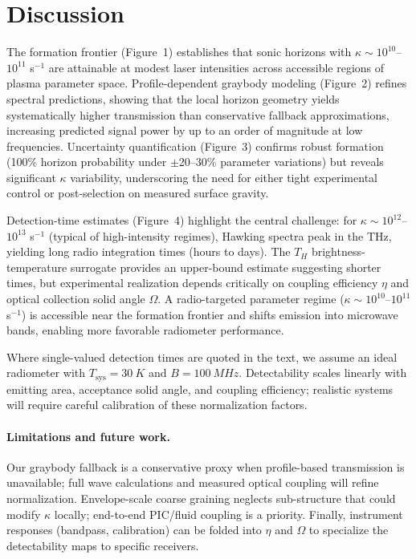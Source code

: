 \documentclass[11pt]{article}
\begin{document}
\section{Discussion}
The formation frontier (Figure~1) establishes that sonic horizons with $\kappa \sim 10^{10}$--$10^{11}$ s$^{-1}$ are attainable at modest laser intensities across accessible regions of plasma parameter space. Profile-dependent graybody modeling (Figure~2) refines spectral predictions, showing that the local horizon geometry yields systematically higher transmission than conservative fallback approximations, increasing predicted signal power by up to an order of magnitude at low frequencies. Uncertainty quantification (Figure~3) confirms robust formation (100\% horizon probability under $\pm$20--30\% parameter variations) but reveals significant $\kappa$ variability, underscoring the need for either tight experimental control or post-selection on measured surface gravity.

Detection-time estimates (Figure~4) highlight the central challenge: for $\kappa \sim 10^{12}$--$10^{13}$ s$^{-1}$ (typical of high-intensity regimes), Hawking spectra peak in the THz, yielding long radio integration times (hours to days). The $T_H$ brightness-temperature surrogate provides an upper-bound estimate suggesting shorter times, but experimental realization depends critically on coupling efficiency $\eta$ and optical collection solid angle $\Omega$. A radio-targeted parameter regime ($\kappa \sim 10^{10}$--$10^{11}$ s$^{-1}$) is accessible near the formation frontier and shifts emission into microwave bands, enabling more favorable radiometer performance.

Where single-valued detection times are quoted in the text, we assume an ideal radiometer with $T_{\mathrm{sys}}=\SI{30}{K}$ and $B=\SI{100}{MHz}$. Detectability scales linearly with emitting area, acceptance solid angle, and coupling efficiency; realistic systems will require careful calibration of these normalization factors.

\paragraph{Limitations and future work.}
Our graybody fallback is a conservative proxy when profile-based transmission is unavailable; full wave calculations and measured optical coupling will refine normalization. Envelope-scale coarse graining neglects sub-structure that could modify $\kappa$ locally; end-to-end PIC/fluid coupling is a priority. Finally, instrument responses (bandpass, calibration) can be folded into $\eta$ and $\Omega$ to specialize the detectability maps to specific receivers.
\end{document}

